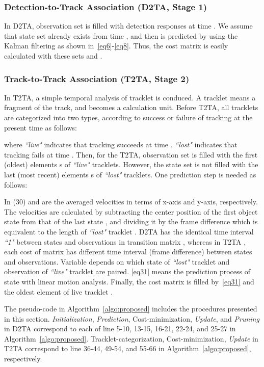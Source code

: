 \documentclass[journal]{IEEEtran}
\newcounter{ct}
\begin{document}
\subsubsection{Detection-to-Track Association (D2TA, Stage 1)}
\label{DA:D2TA}
In D2TA, observation set  is filled with detection responses at time . We assume that state set  already exists from time , and then  is predicted by using the Kalman filtering as shown in~\eqref{eq6}-\eqref{eq8}. Thus, the cost matrix  is easily calculated with these sets  and .
\subsubsection{Track-to-Track Association (T2TA, Stage 2)}
\label{DA:T2TA}
In T2TA, a simple temporal analysis of tracklet is conduced. A tracklet means a fragment of the track, and becomes a calculation unit.
Before T2TA, all tracklets are categorized into two types, according to success or failure of tracking at the present time  as follows:

where \textit{``live"} indicates that tracking succeeds at time . \textit{``lost"} indicates that tracking fails at time . Then, for the T2TA, observation set  is filled with the first (oldest) elements s of \textit{``live"} tracklets. However, the state set  is not filled with the last (most recent) elements s of \textit{``lost"} tracklets. One prediction step is needed as follows:

In (30)  and  are the averaged velocities in terms of x-axis and y-axis, respectively. The velocities are calculated by subtracting the center position of the first object state  from that of the last state , and dividing it by the frame difference  which is equivalent to the length of \textit{``lost"} tracklet . D2TA has the identical time interval \textit{``1"} between states and observations in transition matrix , whereas in T2TA , each cost of matrix  has different time interval (frame difference) between states and observations. Variable  depends on which state of \textit{``lost"} tracklet and observation of \textit{``live"} tracklet are paired. \eqref{eq31} means the prediction process of state with linear motion analysis. Finally, the cost matrix  is filled by~\eqref{eq31} and the oldest element  of live tracklet .

The pseudo-code in Algorithm~\ref{algo:proposed} includes the procedures presented in this section. \textit{Initialization}, \textit{Prediction}, Cost-minimization, \textit{Update}, and \textit{Pruning} in D2TA correspond to each of line 5-10, 13-15, 16-21, 22-24, and 25-27 in Algorithm~\ref{algo:proposed}. Tracklet-categorization, Cost-minimization, \textit{Update} in T2TA correspond to line 36-44, 49-54, and 55-66 in Algorithm~\ref{algo:proposed}, respectively.
\end{document}
